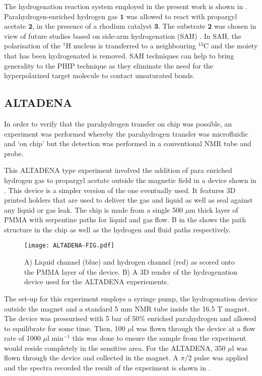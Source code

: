 The hydrogenation reaction system employed in the present work is shown in
.
Para\-hydrogen-en\-riched hydrogen gas $\mathbf{1}$ was
allowed to react with propargyl acetate $\mathbf{2}$, in the presence of
a rhodium catalyst $\mathbf{3}$. The substrate $\mathbf{2}$ was chosen in
view of future studies based on side-arm hydrogenation (SAH)
\cite{Reineri:2015he,cavallari201813,cavallari2015effects}. In SAH, the
polarisation of the $^1$H nucleus is transferred to a neighbouring $^13$C
and the moiety that has been hydrogenated is removed. SAH techniques can
help to bring generality to the PHIP technique as they eliminate the need for
the hyperpolarized target molecule to contact unsaturated bonds.

\subsection{ALTADENA}

In order to verify that the parahydrogen transfer on chip was possible, an
experiment was performed whereby the parahydrogen transfer was microfluidic
and ‘on chip’ but the detection was performed in a conventional NMR tube and probe.

This ALTADENA type experiment involved the addition of para enriched hydrogen
gas to propargyl acetate outside the magnetic field in a device shown in . This device
is a simpler version of the one eventually used.
It features 3D printed holders that are used to deliver the gas and liquid as
well as seal against any liquid or gas leak. The chip is made from a single 500
$\mu$m thick layer of PMMA with serpentine paths for liquid and gas flow. B in the
 shows the path structure in the chip as well as the hydrogen and fluid paths
respectively.

\begin{figure}[h]
  \begin{center}
  \texttt{[image: ALTADENA-FIG.pdf]}
  \end{center}
  \caption{A) Liquid channel (blue) and hydrogen channel (red) as scored
  onto the PMMA layer of the device. B) A 3D render of the hydrogenation device
  used for the ALTADENA experiements.}
  \label{fig:AltadenaChip}
\end{figure}

The set-up for this experiment employs a syringe pump, the hydrogenation device
outside the magnet and a standard 5 mm NMR tube inside the 16.5 T magnet. The device
was pressurised with 5 bar of 50\% enriched parahydrogen and allowed to equilibrate
for some time. Then, 100 $\mu$l was flown through the device at a flow rate of 1000
$\mu$l min$^{-1}$ this was done to ensure the sample from the experiment would reside
completely in the sensitive area. For the ALTADENA, 350 $\mu$l was flown through
the device and collected in the magnet. A $\pi$/2 pulse was applied and the spectra
recorded the result of the experiment is shown in .

